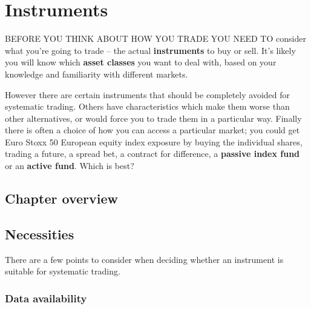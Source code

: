 \chapter{Instruments}

BEFORE YOU THINK ABOUT HOW YOU TRADE YOU NEED TO consider what you're going to trade -- the actual \textbf{instruments} to buy or sell. It's likely you will know which \textbf{asset classes} you want to deal with, based on your knowledge and familiarity with different markets.

However there are certain instruments that should be completely avoided for systematic trading. Others have characteristics which make them worse than other alternatives, or would force you to trade them in a particular way. Finally there is often a choice of how you can access a particular market; you could get Euro Stoxx 50 European equity index exposure by buying the individual shares, trading a future, a spread bet, a contract for difference, a \textbf{passive index fund} or an \textbf{active fund}. Which is best?

\section*{Chapter overview}  {}

\begin{chapteroverviewtable}
\end{chapteroverviewtable}

\section*{Necessities}  {}

There are a few points to consider when deciding whether an instrument is suitable for systematic trading.

\subsection*{Data availability}

